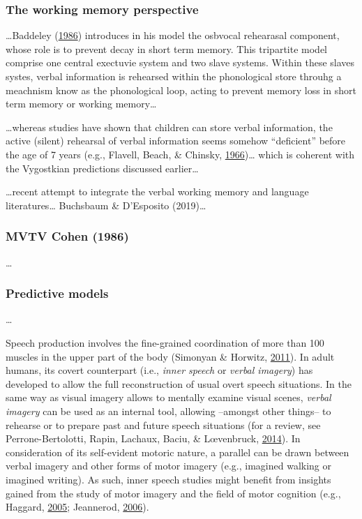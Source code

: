 \documentclass[a4paper,12pt,twoside,openright,oldfontcommands]{memoir}
\begin{document}
\hypertarget{the-working-memory-perspective}{%
\subsubsection{The working memory perspective}\label{the-working-memory-perspective}}

\ldots{}Baddeley (\protect\hyperlink{ref-baddeley_working_1986}{1986}) introduces in his model the osbvocal rehearasal component, whose role is to prevent decay in short term memory. This tripartite model comprise one central exectuvie system and two slave systems. Within these slaves systes, verbal information is rehearsed within the phonological store throuhg a meachnism know as the phonological loop, acting to prevent memory loss in short term memory or working memory\ldots{}

\ldots whereas studies have shown that children can store verbal information, the active (silent) rehearsal of verbal information seems somehow \enquote{deficient} before the age of 7 years (e.g., Flavell, Beach, \& Chinsky, \protect\hyperlink{ref-flavell_spontaneous_1966}{1966})\ldots{} which is coherent with the Vygostkian predictions discussed earlier\ldots{}

\ldots recent attempt to integrate the verbal working memory and language literatures\ldots{} Buchsbaum \& D'Esposito (2019)\ldots{}

\hypertarget{mvtv-cohen-1986}{%
\subsubsection{MVTV Cohen (1986)}\label{mvtv-cohen-1986}}

\ldots{}

\hypertarget{predictive-models}{%
\subsubsection{Predictive models}\label{predictive-models}}

\ldots{}

Speech production involves the fine-grained coordination of more than 100 muscles in the upper part of the body (Simonyan \& Horwitz, \protect\hyperlink{ref-simonyan_laryngeal_2011}{2011}). In adult humans, its covert counterpart (i.e., \emph{inner speech} or \emph{verbal imagery}) has developed to allow the full reconstruction of usual overt speech situations. In the same way as visual imagery allows to mentally examine visual scenes, \emph{verbal imagery} can be used as an internal tool, allowing --amongst other things-- to rehearse or to prepare past and future speech situations (for a review, see Perrone-Bertolotti, Rapin, Lachaux, Baciu, \& Lœvenbruck, \protect\hyperlink{ref-Perrone-Bertolotti2014}{2014}). In consideration of its self-evident motoric nature, a parallel can be drawn between verbal imagery and other forms of motor imagery (e.g., imagined walking or imagined writing). As such, inner speech studies might benefit from insights gained from the study of motor imagery and the field of motor cognition (e.g., Haggard, \protect\hyperlink{ref-haggard_conscious_2005}{2005}; Jeannerod, \protect\hyperlink{ref-jeannerod_motor_2006}{2006}).
\end{document}
